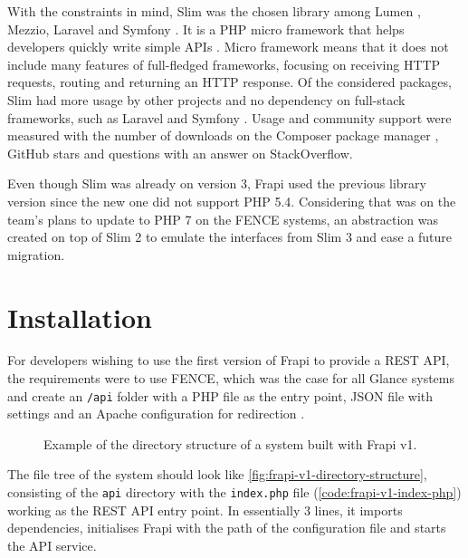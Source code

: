 With the constraints in mind, Slim was the chosen library among Lumen \cite{lumen-website}, Mezzio\cite{mezzio-website}, Laravel\cite{laravel-website} and Symfony \cite{symfony-website}. It is a PHP micro framework that helps developers quickly write simple APIs \cite{slim-website}. Micro framework means that it does not include many features of full-fledged frameworks, focusing on receiving HTTP requests, routing and returning an HTTP response. Of the considered packages, Slim had more usage by other projects and no dependency on full-stack frameworks, such as Laravel \cite{laravel-website} and Symfony \cite{symfony-website}. Usage and community support were measured with the number of downloads on the Composer package manager \cite{composer-website}, GitHub stars and questions with an answer on StackOverflow.

Even though Slim was already on version 3, Frapi used the previous library version since the new one did not support PHP 5.4. Considering that was on the team's plans to update to PHP 7 on the FENCE systems, an abstraction was created on top of Slim 2 \cite{slim-2-doc} to emulate the interfaces from Slim 3 and ease a future migration.

\section{Installation}

For developers wishing to use the first version of Frapi to provide a REST API, the requirements were to use FENCE, which was the case for all Glance systems and create an \texttt{/api} folder with a PHP file as the entry point, JSON file with settings and an Apache configuration for redirection \cite{frapi-v1-setup-documentation}.

\begin{figure}
\centering
\begin{minipage}{0.9\textwidth}
\end{minipage}
\caption{Example of the directory structure of a system built with Frapi v1.}
\label{fig:frapi-v1-directory-structure}
\end{figure}

The file tree of the system should look like \autoref{fig:frapi-v1-directory-structure}, consisting of the \texttt{api} directory with the \texttt{index.php} file (\autoref{code:frapi-v1-index-php}) working as the REST API entry point. In essentially 3 lines, it imports dependencies, initialises Frapi with the path of the configuration file and starts the API service.

